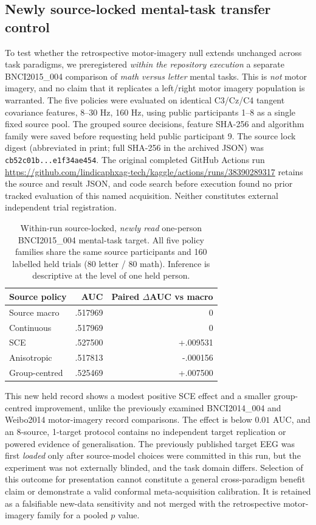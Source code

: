 \subsection{Newly source-locked mental-task transfer control}
\label{sec:p3-bnci2015-004}
To test whether the retrospective motor-imagery null extends
unchanged across task paradigms, we preregistered
\emph{within the repository execution} a separate
BNCI2015\_004 comparison of \emph{math versus letter}
mental tasks. This is \emph{not} motor imagery, and no
claim that it replicates a left/right motor imagery
population is warranted. The five policies were evaluated
on identical C3/Cz/C4 tangent covariance features,
8--30 Hz, 160 Hz, using public participants 1--8
as a single fixed source pool.
The grouped source decisions, feature SHA-256 and
algorithm family were saved before requesting held
public participant 9. The source lock digest (abbreviated in print; full SHA-256 in the archived JSON) was
\texttt{cb52c01b...e1f34ae454}.
The original completed GitHub Actions run
\url{https://github.com/lindicaphxag-tech/kaggle/actions/runs/38390289317}
retains the source and result JSON, and code search
before execution found no prior tracked evaluation
of this named acquisition. Neither constitutes
external independent trial registration.

\begin{table}[ht]\centering\small
\caption{Within-run source-locked, \emph{newly read} one-person
BNCI2015\_004 mental-task target. All five policy
families share the same source participants and 160
labelled held trials (80 letter / 80 math). Inference
is descriptive at the level of one held person.}
\label{tab:p3-bnci2015004}
\begin{tabular}{lrr}
\toprule
Source policy & AUC & Paired $\Delta$AUC vs macro\\
\midrule
Source macro & .517969 & 0\\
Continuous & .517969 & 0\\
SCE & .527500 & +.009531\\
Anisotropic & .517813 & -.000156\\
Group-centred & .525469 & +.007500\\
\bottomrule
\end{tabular}
\end{table}

This new held record shows a modest positive SCE
effect and a smaller group-centred improvement,
unlike the previously examined BNCI2014\_004 and
Weibo2014 motor-imagery record comparisons.
The effect is below $0.01$ AUC, and an 8-source,
1-target protocol contains no independent target
replication or powered evidence of generalisation.
The previously published target EEG was first \emph{loaded}
only after source-model choices were committed in this run,
but the experiment was not externally blinded,
and the task domain differs. Selection of this
outcome for presentation cannot constitute a
general cross-paradigm benefit claim or
demonstrate a valid conformal meta-acquisition
calibration. It is retained as a falsifiable
new-data sensitivity and not merged with the
retrospective motor-imagery family for a
pooled $p$ value.
